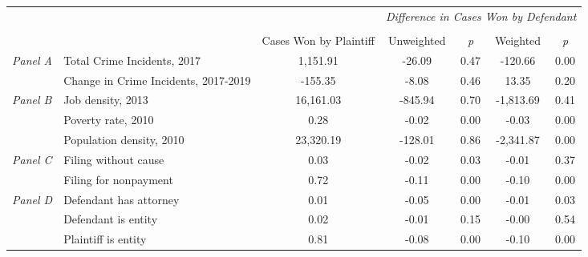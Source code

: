 \begin{tabular}{llccccc}
\toprule
 &  & \textit{} & \multicolumn{4}{c}{\textit{Difference in Cases Won by Defendant}} \\
\cline{4-7}
\\
 &  & Cases Won by Plaintiff & Unweighted & \emph{p} & Weighted & \emph{p} \\
\midrule
\multirow[c]{2}{.75cm}{\textit{Panel A}} & Total Crime Incidents, 2017 & 1,151.91 & -26.09 & 0.47 & -120.66 & 0.00 \\
 & Change in Crime Incidents, 2017-2019 & -155.35 & -8.08 & 0.46 & 13.35 & 0.20 \\
\cline{1-7}
\multirow[c]{3}{.75cm}{\textit{Panel B}} & Job density, 2013 & 16,161.03 & -845.94 & 0.70 & -1,813.69 & 0.41 \\
 & Poverty rate, 2010 & 0.28 & -0.02 & 0.00 & -0.03 & 0.00 \\
 & Population density, 2010 & 23,320.19 & -128.01 & 0.86 & -2,341.87 & 0.00 \\
\cline{1-7}
\multirow[c]{2}{.75cm}{\textit{Panel C}} & Filing without cause & 0.03 & -0.02 & 0.03 & -0.01 & 0.37 \\
 & Filing for nonpayment & 0.72 & -0.11 & 0.00 & -0.10 & 0.00 \\
\cline{1-7}
\multirow[c]{3}{.75cm}{\textit{Panel D}} & Defendant has attorney & 0.01 & -0.05 & 0.00 & -0.01 & 0.03 \\
 & Defendant is entity & 0.02 & -0.01 & 0.15 & -0.00 & 0.54 \\
 & Plaintiff is entity & 0.81 & -0.08 & 0.00 & -0.10 & 0.00 \\
\cline{1-7}
\bottomrule
\end{tabular}
